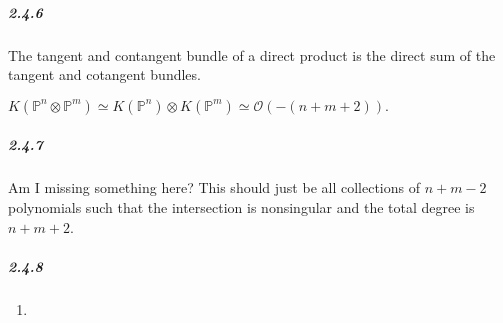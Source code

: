 \documentclass[10pt,letter]{article}
\begin{document}
\subparagraph{2.4.6} The tangent and contangent bundle of a direct product is the direct sum of the tangent and cotangent bundles. 

$K(\mathbb{P}^n \otimes \mathbb{P}^m) \simeq K(\mathbb{P}^n) \otimes K(\mathbb{P}^m) \simeq \mathcal{O}(-(n+m+2)).$

\subparagraph{2.4.7} Am I missing something here? This should just be all collections of $n+m-2$ polynomials such that the intersection is nonsingular and the total degree is $n+m+2$.

\subparagraph{2.4.8} \begin{enumerate}
\item 
\end{enumerate} 
%
\end{document}
